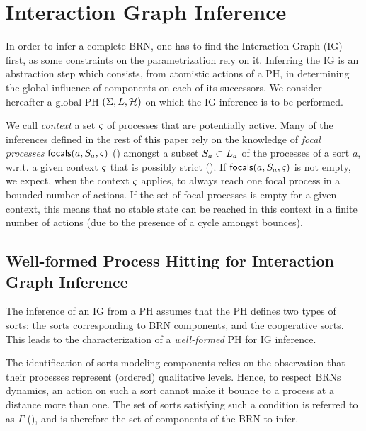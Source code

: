 \section{Interaction Graph Inference}\label{sec:infer-IG}

In order to infer a complete BRN, one has to find the Interaction Graph (IG) first, as some
constraints on the parametrization rely on it.
Inferring the IG is an abstraction step which consists, from atomistic actions of a PH, in determining the global influence of components on each of its successors.
We consider hereafter a global PH $(\Sigma,L,\mathcal{H})$ on which the IG inference is to be
performed.

We call \emph{context} a set $\varsigma$ of processes that are potentially active.
Many of the inferences defined in the rest of this paper rely on the knowledge of \emph{focal
processes} $\mathsf{focals}(a,S_a,\varsigma)$ () amongst a subset $S_a \subset L_a$ of the processes of a sort $a$, w.r.t. a given context $\varsigma$ that is possibly strict ().
If $\mathsf{focals}(a,S_a,\varsigma)$ is not empty, we expect, when the context $\varsigma$ applies, to always reach one focal process in a bounded number of actions.
If the set of focal processes is empty for a given context, this means that no stable state can be reached in this context in a finite number of actions (due to the presence of a cycle amongst bounces).



\subsection{Well-formed Process Hitting for Interaction Graph Inference}\label{ssec:wf}

The inference of an IG from a PH assumes that the PH defines two types of sorts:
the sorts corresponding to BRN components, and the cooperative sorts.
This leads to the characterization of a \emph{well-formed} PH for IG inference.

The identification of sorts modeling components relies on the observation that their processes
represent (ordered) qualitative levels.
Hence, to respect BRNs dynamics, an action on such a sort cannot make it bounce to a process at a distance more than one.
The set of sorts satisfying such a condition is referred to as $\Gamma$
(), and is therefore the set of components of the BRN to infer.

